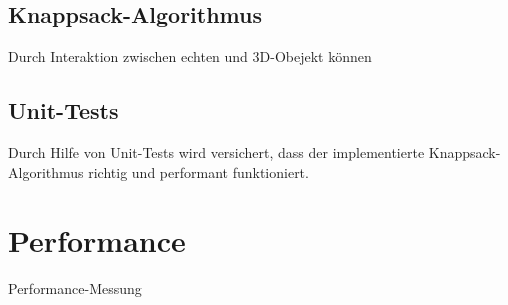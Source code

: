 \subsection{Knappsack-Algorithmus}
Durch Interaktion zwischen echten und 3D-Obejekt können

\subsection{Unit-Tests}
Durch Hilfe von Unit-Tests wird versichert, dass der implementierte Knappsack-Algorithmus
richtig und performant funktioniert.

\section{Performance}
Performance-Messung

